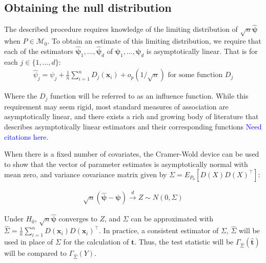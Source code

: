 \documentclass{article}
\newcommand{\vmat}{\Sigma}
\newcommand{\rvo}{X}
\newcommand{\disto}{P}
\newcommand{\tst}{\hat{\boldsymbol{t}}}
\newcommand{\rvt}{Y}
\newcommand{\rvv}{Z}
\newcommand{\Gammafe}{\Gamma_{\hat{\Sigma}}}
\begin{document}
\subsection{Obtaining the null distribution}
\label{ssec:obtaining_null}
The described procedure requires knowledge of the limiting distribution of $\sqrt{n}\hat{\boldsymbol{\psi}}$ when $P \in \mathscr{M}_0$.  To obtain an estimate of this limiting distribution, we require that each of the estimators $\hat{\boldsymbol{\psi}}_1, \dots, \hat{\boldsymbol{\psi}}_d$ of $\boldsymbol{\psi}_1, \dots, \boldsymbol{\psi}_d$ is asymptotically linear.  That is for each $j \in \{1, \dots, d\}$:
\begin{align*}
\hat{\psi}_j = \psi_j + \frac{1}{n}\sum_{i=1}^n D_j(\boldsymbol{x}_i) + o_p(1/\sqrt{n}) \text{ for some function } D_j
\end{align*}

Where the $D_j$ function will be referred to as an influence function. While this requirement may seem rigid, most standard measures of association are asymptotically linear, and there exists a rich and growing body of literature that describes asymptotically linear estimators and their corresponding functions \textcolor{blue}{Need citations here}.


When there is a fixed number of covariates, the Cramer-Wold device can be used to show that the vector of parameter estimates is asymptotically normal with mean zero, and variance covariance matrix given by $\Sigma = E_{\disto_0}\left[D(\rvo) D(\rvo)^\top \right]$:

\begin{align*}
    \sqrt{n}\left(\hat{\boldsymbol{\psi}} - \boldsymbol{\psi}\right) \xrightarrow{d} \rvv \sim N\left(0, \Sigma\right)
\end{align*}

Under $H_0$, $\sqrt{n}\hat{\boldsymbol{\psi}}$ converges to $Z$, and $\Sigma$ can be approximated with $\widehat{\Sigma} = \frac{1}{n}\sum_{i = 1}^n D(\boldsymbol{x}_i) D(\boldsymbol{x}_i)^\top$.  In practice, a consistent estimator of $\vmat$, $\hat{\vmat}$ will be used in place of $\vmat$ for the calculation of $\tst$. Thus, the test statistic will be $\Gammafe(\tst)$ will be compared to $\Gammafe(\rvt)$.
\end{document}
